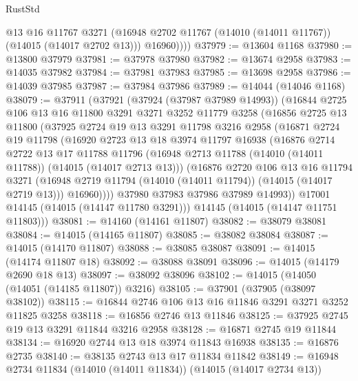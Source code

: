 \begin{lexlean}{RustStd}
\begin{coremodule}
            @13
            @16
            @11767
            @3271
            (@16948 @2702 @11767 (@14010 (@14011 @11767)) (@14015 (@14017 @2702 @13)))
            @16960))))
@37979 := @13604 @1168
@37980 := @13800 @37979
@37981 := @37978 @37980
@37982 := @13674 @2958
@37983 := @14035 @37982
@37984 := @37981 @37983
@37985 := @13698 @2958
@37986 := @14039 @37985
@37987 := @37984 @37986
@37989 := @14044 (@14046 @1168)
@38079 := @37911
    (@37921
      (@37924 (@37987 @37989 @14993))
      (@16844
        @2725
        @106
        @13
        @16
        @11800
        @3291
        @3271
        @3252
        @11779
        @3258
        (@16856
          @2725
          @13
          @11800
          (@37925
            @2724
            @19
            @13
            @3291
            @11798
            @3216
            @2958
            (@16871
              @2724
              @19
              @11798
              (@16920
                @2723
                @13
                @18
                @3974
                @11797
                @16938
                (@16876
                  @2714
                  @2722
                  @13
                  @17
                  @11788
                  @11796
                  (@16948 @2713 @11788 (@14010 (@14011 @11788)) (@14015 (@14017 @2713 @13)))
                  (@16876
                    @2720
                    @106
                    @13
                    @16
                    @11794
                    @3271
                    (@16948 @2719 @11794 (@14010 (@14011 @11794)) (@14015 (@14017 @2719 @13)))
                    @16960))))
            @37980
            @37983
            @37986
            @37989
            @14993))
        @17001
        @14145
        (@14015 (@14147 @11780 @3291)))
      @14145
      (@14015 (@14147 @11751 @11803)))
@38081 := @14160 (@14161 @11807)
@38082 := @38079 @38081
@38084 := @14015 (@14165 @11807)
@38085 := @38082 @38084
@38087 := @14015 (@14170 @11807)
@38088 := @38085 @38087
@38091 := @14015 (@14174 @11807 @18)
@38092 := @38088 @38091
@38096 := @14015 (@14179 @2690 @18 @13)
@38097 := @38092 @38096
@38102 := @14015 (@14050 (@14051 (@14185 @11807)) @3216)
@38105 := @37901 (@37905 (@38097 @38102))
@38115 := @16844 @2746 @106 @13 @16 @11846 @3291 @3271 @3252 @11825 @3258
@38118 := @16856 @2746 @13 @11846
@38125 := @37925 @2745 @19 @13 @3291 @11844 @3216 @2958
@38128 := @16871 @2745 @19 @11844
@38134 := @16920 @2744 @13 @18 @3974 @11843 @16938
@38135 := @16876 @2735
@38140 := @38135 @2743 @13 @17 @11834 @11842
@38149 := @16948 @2734 @11834 (@14010 (@14011 @11834)) (@14015 (@14017 @2734 @13))

\end{coremodule}
\end{lexlean}
